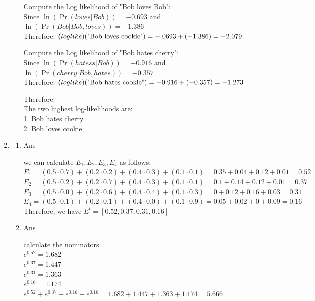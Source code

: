 \documentclass[12pt]{article}
\begin{document}
\begin{enumerate}
\begin{enumerate}
\begin{tcolorbox}
    Compute the Log likelihood of "Bob loves Bob":\\
    Since \(\ln(\Pr(loves | Bob)) = -0.693 \) and \(\ln(\Pr(Bob | Bob, loves)) = - 1.386  \) \\
    Therefore: \(\textbf(loglike)(\text{"Bob loves cookie"}) = -.0693 + (-1.386) =  -2.079\)
    
    Compute the Log likelihood of "Bob hates cherry":\\
    Since \(\ln(\Pr(hatess | Bob)) = -0.916 \) and \(\ln(\Pr(cherry | Bob, hates)) = -0.357\) \\
    Therefore: \(\textbf(loglike)(\text{"Bob hates cookie"}) =-0.916 + (-0.357) = -1.273\)
    
    Therefore: \\
    The two highest log-likelihoods are:\\
    1. Bob hates cherry \\
    2. Bob loves cookie
\end{tcolorbox}
\end{enumerate}

\item
  \begin{enumerate}
  \item Ans
  \begin{tcolorbox}
    we can calculate \(E_1, E_2, E_3, E_4\) as follows:\\
    \(E_1 = (0.5 \cdot 0.7) + (0.2 \cdot 0.2) + (0.4 \cdot 0.3) + (0.1 \cdot 0.1) = 0.35 + 0.04 + 0.12 + 0.01 = 0.52\) \\
    \(E_2 = (0.5 \cdot 0.2) + (0.2 \cdot 0.7) + (0.4 \cdot 0.3) + (0.1 \cdot 0.1) = 0.1 + 0.14 + 0.12 + 0.01 = 0.37\)\\
    \(E_3 = (0.5 \cdot 0.0) + (0.2 \cdot 0.6) + (0.4 \cdot 0.4) + (0.1 \cdot 0.3) =  0 + 0.12 + 0.16 + 0.03 = 0.31\)\\
    \(E_4 = (0.5 \cdot 0.1) + (0.2 \cdot 0.1) + (0.4 \cdot 0.0) + (0.1 \cdot 0.9)= 0.05 + 0.02 + 0 + 0.09 = 0.16\)\\
    Therefore, we have \(E^{t} = [0.52, 0.37, 0.31, 0.16]\)
  \end{tcolorbox}
  

  \item Ans
  \begin{tcolorbox}
    calculate the nominators:\\
    \(e^{0.52} = 1.682\) \\
    \(e^{0.37} = 1.447\) \\
    \(e^{0.31} = 1.363\) \\
    \(e^{0.16} = 1.174\) \\
    \(e^{0.52} + e^{0.37} + e^{0.16} + e^{0.16} = 1.682 + 1.447 + 1.363 + 1.174 = 5.666\)\\
    

\end{tcolorbox}
\end{enumerate}
\end{enumerate}
\end{document}
